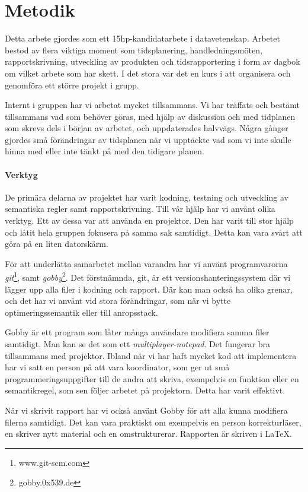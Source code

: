 \documentclass[../Appendix]{subfiles}
\begin{document}
\chapter{Metodik}

Detta arbete gjordes som ett 15hp-kandidatarbete i datavetenskap. Arbetet bestod
av flera viktiga moment som
    tidsplanering,
    handledningsmöten,
    rapportskrivning,
    utveckling av produkten och
    tidsrapportering i form av dagbok om vilket arbete som har skett. I det stora
var det en kurs i att organisera och genomföra ett större projekt i grupp.


Internt i gruppen har vi arbetat mycket tillsammans. Vi har träffats och
bestämt tillsammans vad som behöver göras, med hjälp av diskussion och med
tidplanen som skrevs dels i början av arbetet, och uppdaterades halvvägs. 
Några gånger gjordes små förändringar av tidsplanen när vi upptäckte
vad som vi inte skulle hinna med eller inte tänkt på med den tidigare planen.

\subsubsection{Verktyg}

    De primära delarna av projektet har varit kodning, testning och utveckling
av semantiska regler samt rapportskrivning. Till vår hjälp har vi använt
olika verktyg. Ett av dessa var att använda en projektor. Den har varit till
stor hjälp och låtit hela gruppen fokusera på samma sak samtidigt. Detta
kan vara svårt att göra på en liten datorskärm.

    För att underlätta samarbetet mellan varandra har vi använt programvarorna
\emph{git}\footnote{www.git-scm.com}, samt \emph{gobby}\footnote{gobby.0x539.de}.
Det förstnämnda, git, är ett versionshanteringssystem där vi lägger upp alla
filer i kodning och rapport. Där kan man också ha olika grenar, och det har 
vi använt vid stora förändringar, som när vi bytte optimeringssemantik eller
till anropsstack.

    Gobby är ett program som låter många användare modifiera samma filer
samtidigt. Man kan se det som ett \emph{multiplayer-notepad}. Det fungerar bra
tillsammans med projektor. Ibland när vi har haft mycket kod att implementera
har vi satt en person på att vara koordinator, som ger ut små
programmeringsuppgifter till de andra att skriva, exempelvis en funktion eller
en semantikregel, som sen följer arbetet på projektorn. Detta har varit 
effektivt.

    När vi skrivit rapport har vi också använt Gobby för att alla kunna
modifiera filerna samtidigt. Det kan vara praktiskt om exempelvis en person
korrekturläser, en skriver nytt material och en omstrukturerar. Rapporten 
är skriven i \LaTeX.
\end{document}
